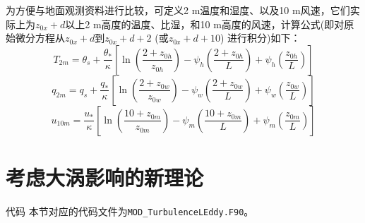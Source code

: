 为方便与地面观测资料进行比较，可定义2 m温度和湿度、以及10 m风速，它们实际上为$z_{0x}+d$以上2 m高度的温度、比湿，和10 m高度的风速，计算公式(即对原始微分方程从$z_{0x}+d$到$z_{0x}+d+2$ (或$z_{0x}+d+10$) 进行积分)如下：
\begin{equation}\label{T2m}
T_{2 m}=\theta_{s}+\frac{\theta_{*}}{\kappa}\left[\ln \left(\frac{2+z_{0 h}}{z_{0 h}}\right)-\psi_{h}\left(\frac{2+z_{0 h}}{L}\right)+\psi_{h}\left(\frac{z_{0 h}}{L}\right)\right]
\end{equation}
\begin{equation}\label{q2m}
q_{2 m}=q_{s}+\frac{q_{*}}{\kappa}\left[\ln \left(\frac{2+z_{0 w}}{z_{0 w}}\right)-\psi_{w}\left(\frac{2+z_{0 w}}{L}\right)+\psi_{w}\left(\frac{z_{0 w}}{L}\right)\right]
\end{equation}
\begin{equation}
u_{10 m}=\frac{u_{*}}{\kappa}\left[\ln \left(\frac{10+z_{0 m}}{z_{0 m}}\right)-\psi_{m}\left(\frac{10+z_{0 m}}{L}\right)+\psi_{m}\left(\frac{z_{0 m}}{L}\right)\right]
\end{equation}


\section{考虑大涡影响的新理论}\label{考虑大涡影响的新理论}
\begin{mymdframed}{代码}
本节对应的代码文件为\texttt{MOD\_TurbulenceLEddy.F90}。
\end{mymdframed}

